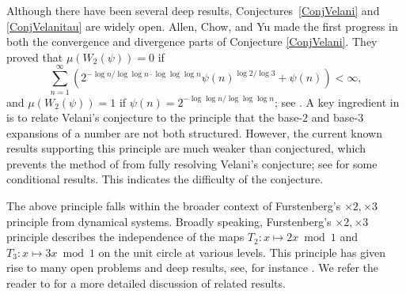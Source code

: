 \documentclass[10pt,a4paper]{amsart}
\numberwithin{equation}{section} %
\begin{document}
Although there have been several deep results, Conjectures~\ref{ConjVelani} and \ref{ConjVelanitau} are widely open. Allen, Chow, and Yu \cite{ACY24} made the first progress in both the convergence and divergence parts of Conjecture \ref{ConjVelani}.  They proved that $\mu(W_{2}(\psi))=0$ if 
$$\sum_{n=1}^{\infty}\left(2^{-\log n/\log \log n \cdot \log \log \log n}\psi(n)^{\log 2/\log 3}+\psi(n)\right)<\infty,$$
and $\mu(W_{2}(\psi))=1$ if $\psi(n)=2^{-\log \log n/\log \log \log n}$; see \cite[Theorems 1.5, 1.9]{ACY24}.
A key ingredient in \cite{ACY24} is to relate   Velani's conjecture to the principle that the base-$2$ and base-$3$ expansions of a number are not both structured. However, the current known results supporting this principle are much weaker than conjectured, which prevents the method of \cite{ACY24} from fully resolving Velani's conjecture; see \cite[Section 5]{ACY24} for some conditional results. This indicates the difficulty of the conjecture. 

The above principle  falls within the broader context of  Furstenberg's $\times 2, \times 3$ principle from dynamical systems. Broadly speaking, Furstenberg's $\times 2, \times 3$ principle describes the independence of the maps $T_2: x\mapsto 2x\bmod1$ and $T_3: x\mapsto 3x\bmod1$ on the unit circle  at various levels. This principle has given rise to  many open problems and deep results, see, for instance \cite{Furstenberg67,Host95,HS15E,Shmerkin19,Wu19A,CLW26}.  We refer the reader to \cite[Section 1]{Baker25A} for a more detailed discussion of related  results. 
\end{document}
